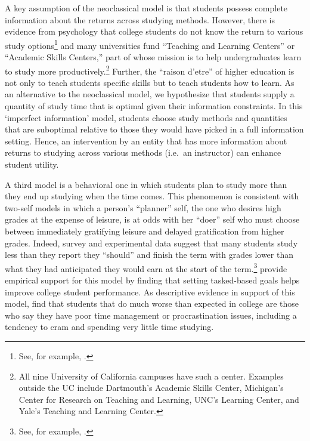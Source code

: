 \documentclass[12pt]{article}
\begin{document}
A key assumption of the neoclassical model is that students possess complete information about the returns across studying methods.
However, there is evidence from psychology that college students do not know the return to various study options\footnote{See, for example, \textcite{mccabe2011,prcc2007,drmnw2013}.} and many universities fund ``Teaching and Learning Centers'' or ``Academic Skills Centers,'' part of whose mission is to help undergraduates learn to study more productively.\footnote{All nine University of California campuses have such a center. Examples outside the UC include Dartmouth's Academic Skills Center, Michigan's Center for Research on Teaching and Learning, UNC's Learning Center, and Yale's Teaching and Learning Center.} Further, the ``raison d'etre'' of higher education is not only to teach students specific skills but to teach students how to learn.
As an alternative to the neoclassical model, we hypothesize that students supply a quantity of study time that is optimal given their information constraints.
In this `imperfect information' model, students choose study methods and quantities that are suboptimal relative to those they would have picked in a full information setting.
Hence, an intervention by an entity that has more information about returns to studying across various methods (i.e.\ an instructor) can enhance student utility.

A third model is a behavioral one in which students plan to study more than they end up studying when the time comes.
This phenomenon is consistent with two-self models in which a person's ``planner'' self, the one who desires high grades at the expense of leisure, is at odds with her ``doer'' self who must choose between immediately gratifying leisure and delayed gratification from higher grades.
Indeed, survey and experimental data suggest that many students study less than they report they ``should'' and finish the term with grades lower than what they had anticipated they would earn at the start of the term.\footnote{See, for example, \textcite{ferrari1992,ccog2017,lo2016}.}
\textcite{cgpr2020} provide empirical support for this model by finding that setting tasked-based goals helps improve college student performance.
As descriptive evidence in support of this model, \textcite{blmo2019} find that students that do much worse than expected in college are those who say they have poor time management or procrastination issues, including a tendency to cram and spending very little time studying.
\end{document}
